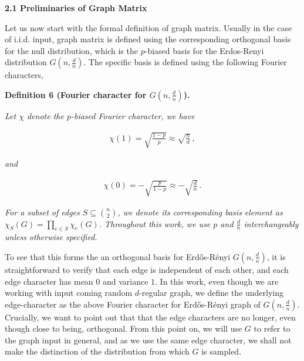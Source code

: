 \documentclass[10pt,a4paper]{article}
\begin{document}
\par\medskip\noindent\textbf{
2.1 Preliminaries of Graph Matrix}\par




Let us now start with the formal definition of graph matrix. Usually in the case of i.i.d. input, graph matrix is defined using the corresponding orthogonal basis for the null distribution, which is the $p$-biased basis for the Erdos-Renyi distribution $G(n,\frac{d}{n})$. The specific basis is defined using the following Fourier characters,\par





\par\medskip\noindent\textbf{
\textbf{Definition 6}\textbf{ }(Fourier character for $G(n,\frac{d}{n})$)\textbf{.}
}\par



\emph{Let $\chi$ denote the $p$-biased Fourier character, we have}\par


\[\begin{gathered}
\chi(1)=\sqrt{\frac{1-p}{p}}\approx\sqrt{\frac{n}{d}}\,,
\end{gathered}\]


\emph{and}\par


\[\begin{gathered}
\chi(0)=-\sqrt{\frac{p}{1-p}}\approx-\sqrt{\frac{d}{n}}\,.
\end{gathered}\]


\emph{For a subset of edges $S\subseteq\binom{n}{2}$, we denote its corresponding basis element as $\chi_{S}(G)=\prod_{e\in S}\chi_{e}(G)$. Throughout this work, we use $p$ and $\frac{d}{n}$ interchangeably unless otherwise specified.}\par






To see that this forms the an orthogonal basis for Erdős-Rényi $G(n,\frac{d}{n})$, it is straightforward to verify that each edge is independent of each other, and each edge character has mean $0$ and variance $1$. In this work, even though we are working with input coming random $d$-regular graph, we define the underlying edge-character as the above Fourier character for Erdős-Rényi graph of $G(n,\frac{d}{n})$. Crucially, we want to point out that that the edge characters are no longer, even though close to being, orthogonal. From this point on, we will use $G$ to refer to the graph input in general, and as we use the same edge character, we shall not make the distinction of the distribution from which $G$ is sampled.\par
\end{document}

